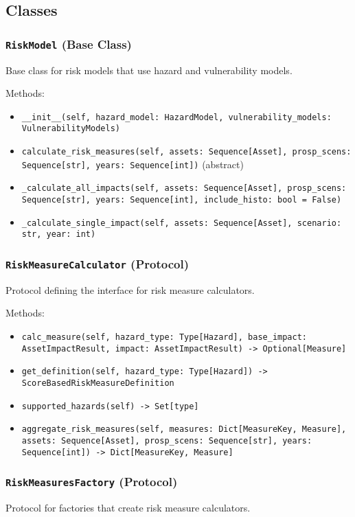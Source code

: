 \documentclass{article}
\begin{document}
\subsection{Classes}

\subsubsection{\texttt{RiskModel} (Base Class)}
Base class for risk models that use hazard and vulnerability models.

Methods:
\begin{itemize}
    \item \texttt{\_\_init\_\_(self, hazard\_model: HazardModel, vulnerability\_models: VulnerabilityModels)}
    \item \texttt{calculate\_risk\_measures(self, assets: Sequence[Asset], prosp\_scens: Sequence[str], years: Sequence[int])} (abstract)
    \item \texttt{\_calculate\_all\_impacts(self, assets: Sequence[Asset], prosp\_scens: Sequence[str], years: Sequence[int], include\_histo: bool = False)}
    \item \texttt{\_calculate\_single\_impact(self, assets: Sequence[Asset], scenario: str, year: int)}
\end{itemize}

\subsubsection{\texttt{RiskMeasureCalculator} (Protocol)}
Protocol defining the interface for risk measure calculators.

Methods:
\begin{itemize}
    \item \texttt{calc\_measure(self, hazard\_type: Type[Hazard], base\_impact: AssetImpactResult, impact: AssetImpactResult) -> Optional[Measure]}
    \item \texttt{get\_definition(self, hazard\_type: Type[Hazard]) -> ScoreBasedRiskMeasureDefinition}
    \item \texttt{supported\_hazards(self) -> Set[type]}
    \item \texttt{aggregate\_risk\_measures(self, measures: Dict[MeasureKey, Measure], assets: Sequence[Asset], prosp\_scens: Sequence[str], years: Sequence[int]) -> Dict[MeasureKey, Measure]}
\end{itemize}

\subsubsection{\texttt{RiskMeasuresFactory} (Protocol)}
Protocol for factories that create risk measure calculators.
\end{document}
